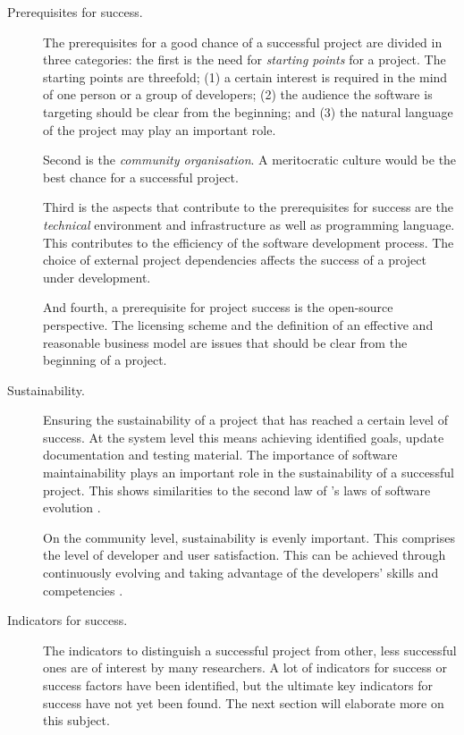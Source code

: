 \begin{description}
	\item[Prerequisites for success.] \hspace{1em} The prerequisites for a good
		chance of a successful project are divided in three categories: the first is
		the need for \textit{starting points} for a project. The starting points
		are threefold; (1) a certain interest is required in the mind of one person
		or a group of developers; (2) the audience the software is targeting
		should be clear from the beginning; and (3) the natural language of the
		project may play an important role.
		
		Second is the \textit{community organisation}. A meritocratic culture would
		be the best chance for a successful project.
		
		Third is the aspects that contribute to the prerequisites for success are the
		\textit{technical} environment and infrastructure as well as programming
		language. This contributes to the efficiency of the software development
		process. The choice of external project dependencies affects the success of a
		project under development.
		
		And fourth, a prerequisite for project success is the open-source
		perspective. The licensing scheme and the definition of an effective and
		reasonable business model are issues that should be clear from the beginning
		of a project.
		
	\item[Sustainability.] \hspace{1em} Ensuring the sustainability of a project
		that has reached a certain level of success. At the system level this means
		achieving identified goals, update documentation and testing material. The
		importance of software maintainability plays an important role in the
		sustainability of a successful project. This shows similarities to the second
		law of \citeauthor{lehman}'s laws of software evolution \cite{lehman}.
		
		On the community level, sustainability is evenly important. This comprises the
		level of developer and user satisfaction. This can be achieved through
		continuously evolving and taking advantage of the developers' skills and
		competencies \cite{androutsellis}.

	\item[Indicators for success.] \hspace{1em} The indicators to distinguish a
		successful project from other, less successful ones are of interest by
		many researchers. A lot of indicators for success or success factors have
		been identified, but the ultimate key indicators for success have not yet
		been found. The next section will elaborate more on this subject.
\end{description}

